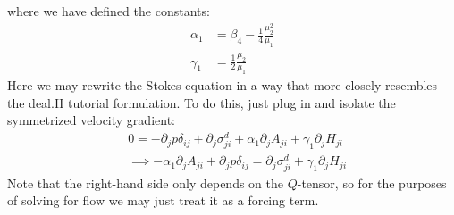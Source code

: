\documentclass[reqno]{article}
\begin{document}
  where we have defined the constants:
  \begin{align}
    \alpha_1 &= \beta_4 - \frac14 \frac{\mu_2^2}{\mu_1} \\
    \gamma_1 &= \frac12 \frac{\mu_2}{\mu_1}
  \end{align}
  Here we may rewrite the Stokes equation in a way that more closely resembles
  the deal.II tutorial formulation.
  To do this, just plug in and isolate the symmetrized velocity gradient:
  \begin{equation}
    \begin{split}
      &0
      =
      - \partial_j p \delta_{ij}
      + \partial_j \sigma^d_{ji}
      + \alpha_1 \partial_j A_{ji}
      + \gamma_1 \partial_j H_{ji} \\
      &\implies
      - \alpha_1 \partial_j A_{ji}
      + \partial_j p \delta_{ij}
      =
      \partial_j \sigma^d_{ji}
      + \gamma_1 \partial_j H_{ji}
    \end{split}
  \end{equation}
  Note that the right-hand side only depends on the $Q$-tensor, so for the
  purposes of solving for flow we may just treat it as a forcing term.
\end{document}
